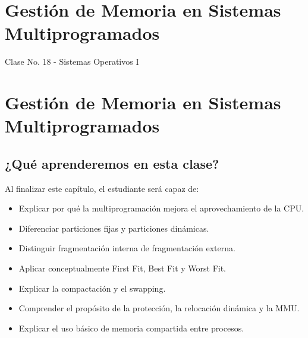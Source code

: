 \documentclass[
  spanish,
  letterpaper,
]{scrbook}
\providecommand{\tightlist}{%
  \setlength{\itemsep}{0pt}\setlength{\parskip}{0pt}}
\begin{document}

\chapter{Gestión de Memoria en Sistemas
Multiprogramados}\label{gestiuxf3n-de-memoria-en-sistemas-multiprogramados}

Clase No. 18 - Sistemas Operativos I

\hfill\break


\chapter{Gestión de Memoria en Sistemas
Multiprogramados}\label{gestiuxf3n-de-memoria-en-sistemas-multiprogramados-1}

\section{¿Qué aprenderemos en esta
clase?}\label{quuxe9-aprenderemos-en-esta-clase-1}

Al finalizar este capítulo, el estudiante será capaz de:

\begin{itemize}
\tightlist
\item
  Explicar por qué la multiprogramación mejora el aprovechamiento de la
  CPU.
\item
  Diferenciar particiones fijas y particiones dinámicas.
\item
  Distinguir fragmentación interna de fragmentación externa.
\item
  Aplicar conceptualmente First Fit, Best Fit y Worst Fit.
\item
  Explicar la compactación y el swapping.
\item
  Comprender el propósito de la protección, la relocación dinámica y la
  MMU.
\item
  Explicar el uso básico de memoria compartida entre procesos.
\end{itemize}
\end{document}
